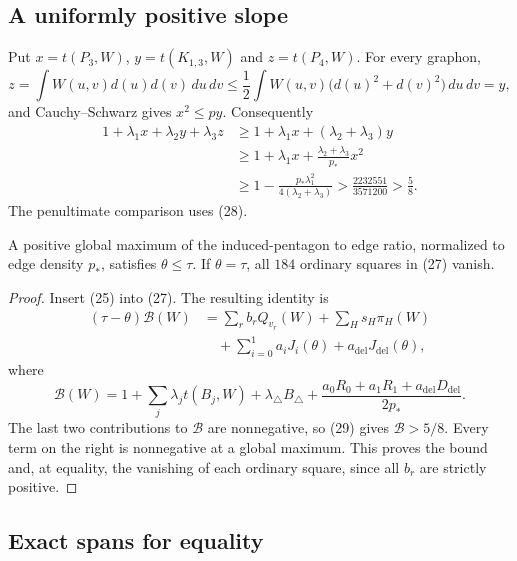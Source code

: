 \subsection{A uniformly positive slope}

Put \(x=t(P_3,W)\), \(y=t(K_{1,3},W)\) and \(z=t(P_4,W)\).
For every graphon,
\[
 z=\int W(u,v)d(u)d(v)\,du\,dv
 \le\frac12\int W(u,v)\bigl(d(u)^2+d(v)^2\bigr)\,du\,dv=y,
\]
and Cauchy--Schwarz gives \(x^2\le py\). Consequently
\begin{equation}
 \begin{aligned}
 1+\lambda_1x+\lambda_2y+\lambda_3z
 &\ge1+\lambda_1x+(\lambda_2+\lambda_3)y\\
 &\ge1+\lambda_1x+\frac{\lambda_2+\lambda_3}{p_*}x^2\\
 &\ge1-\frac{p_*\lambda_1^2}{4(\lambda_2+\lambda_3)}
 >\frac{2232551}{3571200}>\frac58.
 \end{aligned}\tag{29}
\end{equation}
The penultimate comparison uses (28).

\begin{corollary}\label{cor:certificate-bound}
A positive global maximum of the induced-pentagon to edge ratio,
normalized to edge density \(p_*\), satisfies \(\theta\le\tau\).
If \(\theta=\tau\), all \(184\) ordinary squares in (27) vanish.
\end{corollary}
\begin{proof}
Insert (25) into (27). The resulting identity is
\[
 \begin{aligned}
 (\tau-\theta)\mathcal B(W)
 &=\sum_rb_rQ_{v_r}(W)+\sum_Hs_H\pi_H(W)\\
 &\quad+\sum_{i=0}^1a_iJ_i(\theta)
              +a_{\mathrm{del}}J_{\mathrm{del}}(\theta),
 \end{aligned}
\]
where
\[
 \mathcal B(W)=1+\sum_j\lambda_jt(B_j,W)
       +\lambda_\triangle B_\triangle
       +\frac{a_0R_0+a_1R_1+a_{\mathrm{del}}D_{\mathrm{del}}}{2p_*}.
\]
The last two contributions to \(\mathcal B\) are nonnegative, so (29)
gives \(\mathcal B>5/8\). Every term on the right is nonnegative at a
global maximum. This proves the bound and, at equality, the vanishing
of each ordinary square, since all \(b_r\) are strictly positive.
\end{proof}

\subsection{Exact spans for equality}

